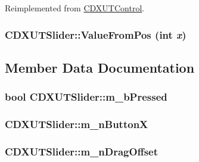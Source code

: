 Reimplemented from \hyperlink{class_c_d_x_u_t_control_a5fb3a79178c678abaa0da57566a09002}{CDXUTControl}.\hypertarget{class_c_d_x_u_t_slider_a9f7de7328ec31bd8a34bc1873f5acdb3}{
\subsubsection[{ValueFromPos}]{ CDXUTSlider::ValueFromPos ({\bf int} {\em x})}}
\label{class_c_d_x_u_t_slider_a9f7de7328ec31bd8a34bc1873f5acdb3}


\subsection{Member Data Documentation}
\hypertarget{class_c_d_x_u_t_slider_a6060a106657615230e6b2cc51f7279ec}{
\subsubsection[{m\_\-bPressed}]{\setlength{\rightskip}{0pt plus 5cm}bool {\bf CDXUTSlider::m\_\-bPressed}}}
\label{class_c_d_x_u_t_slider_a6060a106657615230e6b2cc51f7279ec}
\hypertarget{class_c_d_x_u_t_slider_aa6b6822fb10e3294c1880113e486416b}{
\subsubsection[{m\_\-nButtonX}]{ {\bf CDXUTSlider::m\_\-nButtonX}}}
\label{class_c_d_x_u_t_slider_aa6b6822fb10e3294c1880113e486416b}
\hypertarget{class_c_d_x_u_t_slider_ae051d327e77fc42a5be5d21576d81993}{
\subsubsection[{m\_\-nDragOffset}]{ {\bf CDXUTSlider::m\_\-nDragOffset}}}
